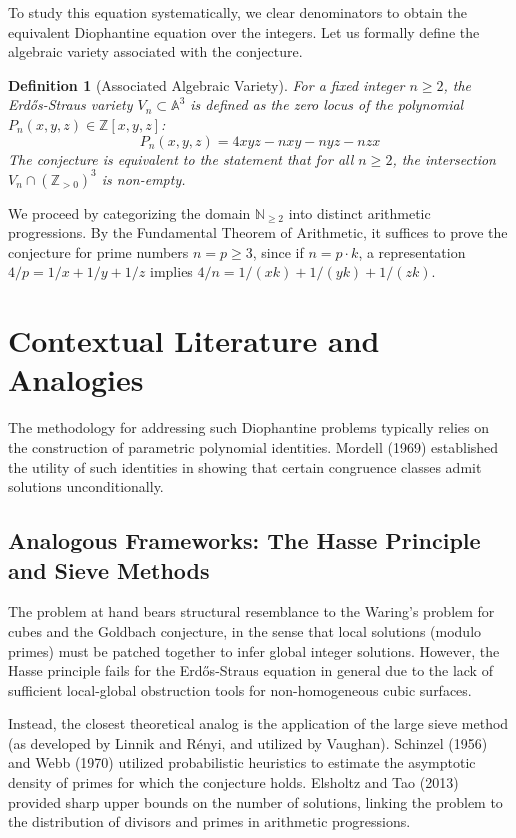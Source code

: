 \documentclass[12pt,a4paper]{article}
\newtheorem{definition}[theorem]{Definition}
\begin{document}
To study this equation systematically, we clear denominators to obtain the equivalent Diophantine equation over the integers. Let us formally define the algebraic variety associated with the conjecture.

\begin{definition}[Associated Algebraic Variety]
For a fixed integer $n \geq 2$, the Erd\H{o}s-Straus variety $V_n \subset \mathbb{A}^3$ is defined as the zero locus of the polynomial $P_n(x,y,z) \in \mathbb{Z}[x,y,z]$:
\begin{equation}
P_n(x, y, z) = 4xyz - nxy - nyz - nzx
\end{equation}
The conjecture is equivalent to the statement that for all $n \geq 2$, the intersection $V_n \cap (\mathbb{Z}_{>0})^3$ is non-empty.
\end{definition}

We proceed by categorizing the domain $\mathbb{N}_{\geq 2}$ into distinct arithmetic progressions. By the Fundamental Theorem of Arithmetic, it suffices to prove the conjecture for prime numbers $n = p \geq 3$, since if $n = p \cdot k$, a representation $4/p = 1/x + 1/y + 1/z$ implies $4/n = 1/(xk) + 1/(yk) + 1/(zk)$.

\newpage
\section{Contextual Literature and Analogies}

The methodology for addressing such Diophantine problems typically relies on the construction of parametric polynomial identities. Mordell (1969) established the utility of such identities in showing that certain congruence classes admit solutions unconditionally.

\subsection{Analogous Frameworks: The Hasse Principle and Sieve Methods}

The problem at hand bears structural resemblance to the Waring's problem for cubes and the Goldbach conjecture, in the sense that local solutions (modulo primes) must be patched together to infer global integer solutions. However, the Hasse principle fails for the Erd\H{o}s-Straus equation in general due to the lack of sufficient local-global obstruction tools for non-homogeneous cubic surfaces.

Instead, the closest theoretical analog is the application of the large sieve method (as developed by Linnik and R\'{e}nyi, and utilized by Vaughan). Schinzel (1956) and Webb (1970) utilized probabilistic heuristics to estimate the asymptotic density of primes for which the conjecture holds. Elsholtz and Tao (2013) provided sharp upper bounds on the number of solutions, linking the problem to the distribution of divisors and primes in arithmetic progressions.
\end{document}
